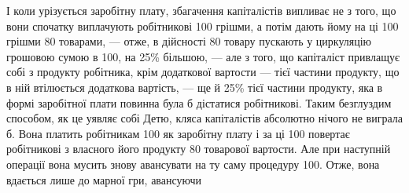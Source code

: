 \roztyagnut{}
І коли урізується заробітну плату, збагачення капіталістів випливає
не з того, що вони спочатку виплачують робітникові 100
грішми, а потім дають йому на ці 100 грішми 80
товарами, — отже, в дійсності 80 товару пускають у циркуляцію
грошовою сумою в 100, на 25\% більшою, — але з того, що капіталіст
привлащує собі з продукту робітника, крім додаткової вартости — тієї
частини продукту, що в ній втілюється додаткова вартість, — ще й
25\% тієї частини продукту, яка в формі заробітної плати повинна була
б дістатися робітникові. Таким безглуздим способом, як це уявляє собі Детю,
кляса капіталістів абсолютно нічого не виграла б. Вона платить робітникам
100 як заробітну плату і за ці 100 повертає робітникові
з власного його продукту 80 товарової вартости. Але
при наступній операції вона мусить знову авансувати на ту саму процедуру
100. Отже, вона вдається лише до марної гри, авансуючи
\parbreak{}  %
